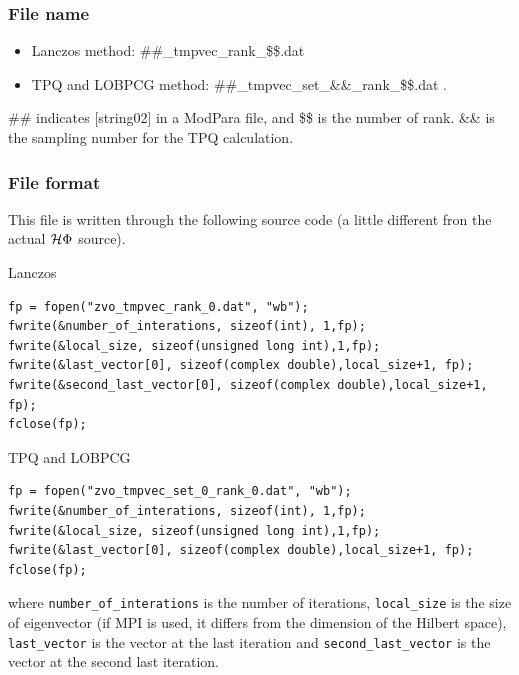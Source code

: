 \subsubsection{File name}
\begin{itemize}
   \item{Lanczos method: \#\#\_tmpvec\_rank\_\$\$.dat}
   \item{TPQ and LOBPCG method: \#\#\_tmpvec\_set\_\&\&\_rank\_\$\$.dat}  .
\end{itemize}
\#\# indicates [string02] in a ModPara file, and \$\$ is the number of rank.
\&\& is the sampling number for the TPQ calculation. 

\subsubsection{File format}

This file is written through the following source code
(a little different fron the actual $\mathcal{H} \Phi$ source).

Lanczos
\\
\begin{minipage}{16cm}
\begin{screen}
\begin{verbatim}
fp = fopen("zvo_tmpvec_rank_0.dat", "wb");
fwrite(&number_of_interations, sizeof(int), 1,fp);
fwrite(&local_size, sizeof(unsigned long int),1,fp);
fwrite(&last_vector[0], sizeof(complex double),local_size+1, fp);
fwrite(&second_last_vector[0], sizeof(complex double),local_size+1, fp);
fclose(fp);
\end{verbatim}
\end{screen}
\end{minipage}

TPQ and LOBPCG
\\
\begin{minipage}{16cm}
\begin{screen}
\begin{verbatim}
fp = fopen("zvo_tmpvec_set_0_rank_0.dat", "wb");
fwrite(&number_of_interations, sizeof(int), 1,fp);
fwrite(&local_size, sizeof(unsigned long int),1,fp);
fwrite(&last_vector[0], sizeof(complex double),local_size+1, fp);
fclose(fp);
\end{verbatim}
\end{screen}
\end{minipage}
where \verb|number_of_interations| is the number of iterations,
\verb|local_size| is the size of eigenvector
(if MPI is used, it differs from the dimension of the Hilbert space),
\verb|last_vector| is the vector at the last iteration and
\verb|second_last_vector| is the vector at the second last iteration.

